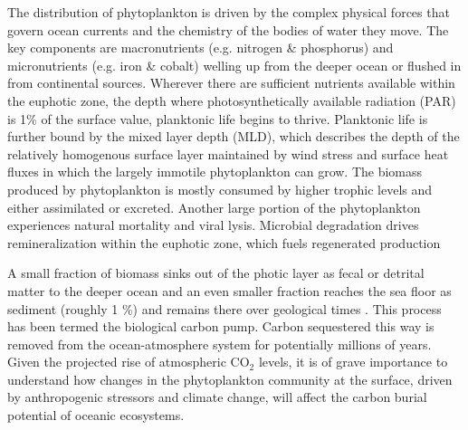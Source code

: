 The distribution of phytoplankton is driven by the complex physical forces that govern ocean currents and the chemistry of the bodies of water they move. The key components are macronutrients (e.g. nitrogen \& phosphorus) and micronutrients (e.g. iron \& cobalt) welling up from the deeper ocean or flushed in from continental sources. Wherever there are sufficient nutrients available within the euphotic zone, 
the depth where photosynthetically available radiation (PAR) is 1\% of the surface value, planktonic life begins to thrive. Planktonic life is further bound by the mixed layer depth (MLD), which describes the depth of the relatively homogenous surface layer maintained by wind stress and surface heat fluxes in which the largely immotile phytoplankton can grow. The biomass produced by phytoplankton is mostly consumed by higher trophic levels and either assimilated or excreted. Another large portion of the phytoplankton experiences natural mortality and viral lysis. Microbial degradation drives remineralization within the euphotic zone, which fuels regenerated production \citep{Eppley1979}

A small fraction of biomass sinks out of the photic layer as fecal or detrital matter to the deeper ocean and an even smaller fraction reaches the sea floor as sediment (roughly 1 \%) and remains there over geological times \citep{Honjo2008}. This process has been termed the biological carbon pump. 
Carbon sequestered this way is removed from the ocean-atmosphere system for potentially millions of years. Given the projected rise of atmospheric CO$_2$ levels, it is of grave importance to understand how changes in the phytoplankton community at the surface, driven by anthropogenic stressors and climate change, will affect the carbon burial potential of oceanic ecosystems. 

